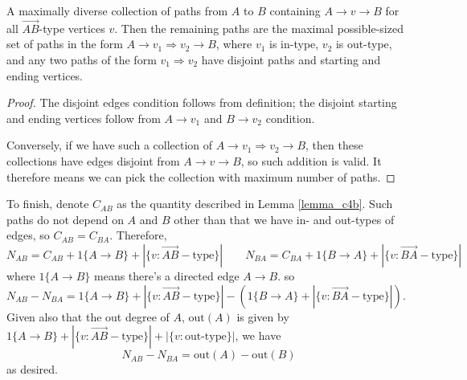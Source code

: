 \documentclass[11pt,a4paper]{article}
\begin{document}
\begin{enumerate}
	    \begin{lemma}
	    	\label{lemma_c4b}
	        A maximally diverse collection of paths from $A$ to $B$ containing $A\to v\to B$ for all $\vec{AB}$-type vertices $v$. Then the remaining paths are the maximal possible-sized set of paths in the form $A\to v_1\Rightarrow v_2\to B$, 
	        where $v_1$ is in-type, $v_2$ is out-type, 
	        and any two paths of the form $v_1\Rightarrow v_2$ have disjoint paths and starting and ending vertices. 
	    \end{lemma}
        \begin{proof}
        	The disjoint edges condition follows from definition; the disjoint starting and ending vertices follow from $A\to v_1$ and $B\to v_2$ condition. 
        	
        	Conversely, if we have such a collection of $A\to v_1\Rightarrow v_2\to B$, then these collections have edges disjoint from $A\to v\to B$, so such addition is valid. It therefore means we can pick the collection with maximum number of paths. 
        \end{proof}
        To finish, denote $C_{AB}$ as the quantity described in Lemma \ref{lemma_c4b}. 
        Such paths do not depend on $A$ and $B$ other than that we have in- and out-types of edges, so $C_{AB}=C_{BA}$. 
        Therefore, 
        \[
        N_{AB} = C_{AB} + 1\{A\to B\} + |\{v: \vec{AB}-\text{type}\}|
        \qquad 
        N_{BA} = C_{BA} + 1\{B\to A\} + |\{v: \vec{BA}-\text{type}\}|
        \]
        where $1\{A\to B\}$ means there's a directed edge $A\to B$. 
	    so $N_{AB}-N_{BA} = 1\{A\to B\} + |\{v: \vec{AB}-\text{type}\}| - (1\{B\to A\} + |\{v: \vec{BA}-\text{type}\}|)$. 
	    Given also that the out degree of $A$, $\text{out}(A)$ is given by 
	    $1\{A\to B\} + |\{v: \vec{AB}-\text{type}\}| + |\{v: \text{out-type}\}|$, 
	    we have 
	    \[
	    N_{AB} - N_{BA} = \text{out}(A) - \text{out}(B)
	    \]
	    as desired. 
	\end{enumerate}
	
	
\end{document}
